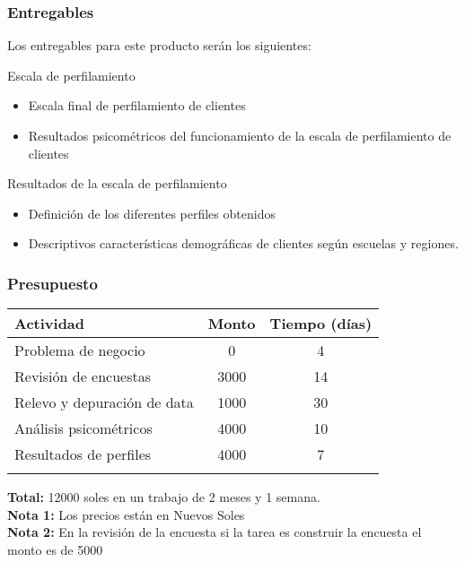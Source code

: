 \documentclass{beamer}
\begin{document}
\begin{frame}
\frametitle{Entregables}

Los entregables para este producto serán los siguientes:


\begin{block}{Escala de perfilamiento}
\begin{itemize}
\item Escala final de perfilamiento de clientes
\item Resultados psicométricos del funcionamiento de la escala de perfilamiento de clientes
\end{itemize}
\end{block}

\begin{block}{Resultados de la escala de perfilamiento}
\begin{itemize}
\item Definición de los diferentes perfiles obtenidos
\item Descriptivos características demográficas de clientes según escuelas y regiones. 
\end{itemize}
\end{block}
\end{frame}

\begin{frame}
\frametitle{Presupuesto}
\begin{table}[ht]
\begin{tabular}{lcc}
\hline
Actividad & Monto & Tiempo (días)   \\ \hline
Problema de negocio & 0 & 4    \\ 
Revisión de encuestas & 3000 & 14    \\ 
Relevo y depuración de data & 1000 & 30    \\ 
Análisis psicométricos & 4000 & 10   \\ 
Resultados de perfiles  & 4000 & 7    \\ \hline 
\\
\end{tabular}
\end{table}


\textbf{Total:} 12000 soles en un trabajo de 2 meses y 1 semana. \\

\textbf{Nota 1:} Los precios están en \alert{Nuevos Soles} \\

\textbf{Nota 2:} En la revisión de la encuesta si la tarea es construir la encuesta el monto es de 5000





\end{frame}
\end{document}
